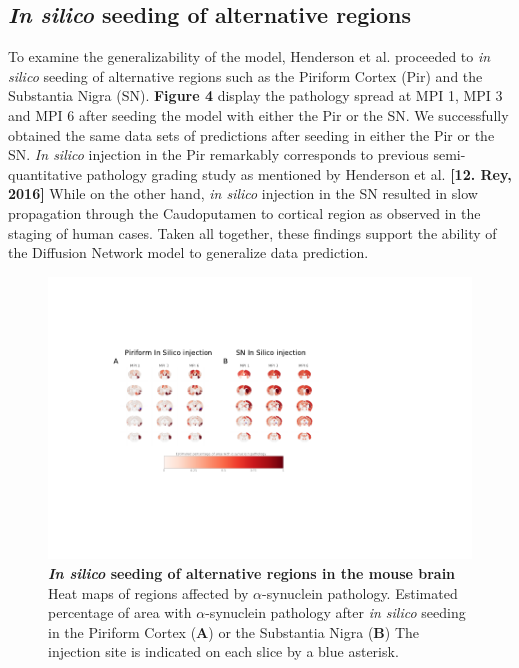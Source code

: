 \subsection{\textit{In silico} seeding of alternative regions}
To examine the generalizability of the model, Henderson et al. proceeded to \textit{in silico} seeding of alternative regions such as the Piriform Cortex (Pir) and the Substantia Nigra (SN). \textbf{Figure 4} display the pathology spread at MPI 1, MPI 3 and MPI 6 after seeding the model with either the Pir or the SN. We successfully obtained the same data sets of predictions after seeding in either the Pir or the SN. \textit{In silico} injection in the Pir remarkably corresponds to previous semi-quantitative pathology grading study as mentioned by Henderson et al. \textbf{[12. Rey, 2016]} While on the other hand, \textit{in silico} injection in the SN resulted in slow propagation through the Caudoputamen to cortical region as observed in the staging of human cases. Taken all together, these findings support the ability of the Diffusion Network model to generalize data prediction.

\begin{figure}
    \hspace*{-2cm} 
    \hspace*{-2cm}
    \hspace*{-2cm}
    \hspace*{-0.7cm}
    \vspace*{-6cm}
    \includegraphics[scale=2.1]{Figures/Fig5.pdf}
    \caption{\textbf{\textit{In silico} seeding of alternative regions in the mouse brain} \\
    Heat maps of regions affected by $\alpha$-synuclein pathology.
    Estimated percentage of area with $\alpha$-synuclein pathology after \textit{in silico} seeding in the Piriform Cortex (\textbf{A}) or the Substantia Nigra (\textbf{B}) The injection site is indicated on each slice by a blue asterisk.}
    \end{figure}
    


